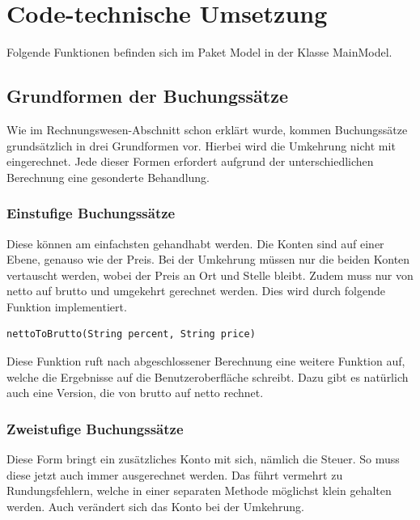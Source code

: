 \documentclass[12pt]{report}
\begin{document}
 
 
\chapter{Code-technische Umsetzung}
\lhead{\thepage}
  
Folgende Funktionen befinden sich im Paket Model in der Klasse MainModel.
 
\section{Grundformen der Buchungssätze}
Wie im Rechnungswesen-Abschnitt schon erklärt wurde, kommen Buchungssätze grundsätzlich in drei Grundformen vor. Hierbei wird die Umkehrung nicht mit eingerechnet. Jede dieser Formen erfordert aufgrund der unterschiedlichen Berechnung eine gesonderte Behandlung.
 
\subsection{Einstufige Buchungssätze}
Diese können am einfachsten gehandhabt werden. Die Konten sind auf einer Ebene, genauso wie der Preis. Bei der Umkehrung müssen nur die beiden Konten vertauscht werden, wobei der Preis an Ort und Stelle bleibt. Zudem muss nur von netto auf brutto und umgekehrt gerechnet werden. Dies wird durch folgende Funktion implementiert.
 
 
\begin{lstlisting}
nettoToBrutto(String percent, String price)
\end{lstlisting}
	
\noindent Diese Funktion ruft nach abgeschlossener Berechnung eine weitere Funktion auf, welche die Ergebnisse auf die Benutzeroberfläche schreibt. Dazu gibt es natürlich auch eine Version, die von brutto auf netto rechnet.
 
\subsection{Zweistufige Buchungssätze}
Diese Form bringt ein zusätzliches Konto mit sich, nämlich die Steuer. So muss diese jetzt auch immer ausgerechnet werden. Das führt vermehrt zu Rundungsfehlern, welche in einer separaten Methode möglichst klein gehalten werden. Auch verändert sich das Konto bei der Umkehrung. 
\end{document}
